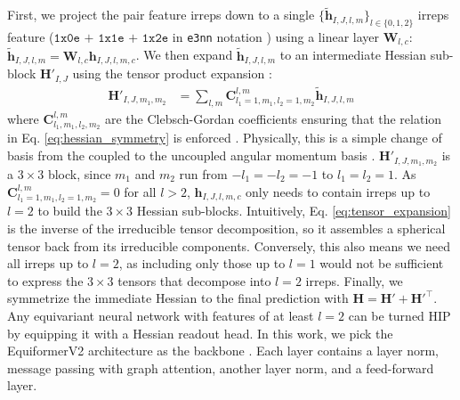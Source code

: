 \documentclass[pdflatex,sn-mathphys-num]{sn-jnl}%
\theoremstyle{thmstyleone}%
\theoremstyle{thmstyletwo}%
\theoremstyle{thmstylethree}%
\begin{document}
First, we project the pair feature irreps down to a single $\{\mathbf{\tilde{h}}_{I,J,l,m}\}_{l\in\{0,1,2\}}$ irreps feature ($\texttt{1x0e + 1x1e + 1x2e}$ in \texttt{e3nn} notation \citep{geiger2022e3nn}) using a linear layer $\mathbf{W}_{l,c}$:
$
\mathbf{\tilde{h}}_{I,J,l,m} = \mathbf{W}_{l,c}\mathbf{h}_{I,J,l,m,c}
$.
We then expand $\mathbf{\tilde{h}}_{I,J,l,m}$  to an intermediate Hessian sub-block $\mathbf{H}'_{I,J}$ using the tensor product expansion \citep{unke2021se}:
\begin{align}
\mathbf{H}'_{I,J,m_1,m_2} &= \sum_{l,m}\mathbf{C}^{l,m}_{l_1=1,m_1,l_2=1,m_2}\mathbf{\tilde{h}}_{I,J,l,m} \label{eq:tensor_expansion}
\end{align}
where $\mathbf{C}^{l,m}_{l_1,m_1,l_2,m_2}$ are the Clebsch-Gordan coefficients ensuring that the relation in Eq. \eqref{eq:hessian_symmetry} is enforced \citep{unke2021se}. Physically, this is a simple change of basis from the coupled to the uncoupled angular momentum basis \citep{edmonds1996angular}.
$\mathbf{H}'_{I,J,m_1,m_2}$ is a $3\times3$ block, since $m_1$ and $m_2$ run from $-l_1=-l_2=-1$ to $l_1=l_2=1$. As $\mathbf{C}^{l,m}_{l_1=1,m_1,l_2=1,m_2} = 0$ for all $l>2$, $\mathbf{h}_{I, J,l,m,c}$ only needs to contain irreps up to $l=2$ to build the $3\times3$ Hessian sub-blocks. Intuitively, Eq. \eqref{eq:tensor_expansion} is the inverse of the irreducible tensor decomposition, so it assembles a spherical tensor back from its irreducible components. Conversely, this also means we need all irreps up to $l=2$, as including only those up to $l=1$ would not be sufficient to express the $3\times3$ tensors that decompose into $l=2$ irreps.
Finally, we symmetrize the immediate Hessian to the final prediction with $\mathbf{H}=\mathbf{H}' + \mathbf{H}'^\top$.\\
Any equivariant neural network \citep{duvalHitchhikerGuideGeometric2024a} with features of at least $l=2$ can be turned HIP by equipping it with a Hessian readout head. In this work, we pick the EquiformerV2 architecture as the backbone \citep{liao2023equiformerv2}. Each layer contains a layer norm, message passing with graph attention, another layer norm, and a feed-forward layer. 
\end{document}
